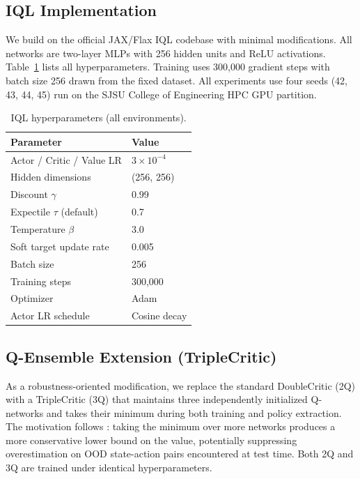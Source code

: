 \documentclass[conference]{IEEEtran}
\begin{document}
\subsection{IQL Implementation}

We build on the official JAX/Flax IQL codebase \cite{kostrikov2022code} with
minimal modifications. All networks are two-layer MLPs with 256 hidden units
and ReLU activations. Table~\ref{tab:hparams} lists all hyperparameters.
Training uses 300,000 gradient steps with batch size 256 drawn from the fixed
dataset. All experiments use four seeds (42, 43, 44, 45) run on the SJSU
College of Engineering HPC GPU partition.

\begin{table}[t]
  \centering
  \caption{IQL hyperparameters (all environments).}
  \label{tab:hparams}
  \begin{tabular}{ll}
    \toprule
    Parameter & Value \\
    \midrule
    Actor / Critic / Value LR & $3\times10^{-4}$ \\
    Hidden dimensions         & (256, 256) \\
    Discount $\gamma$         & 0.99 \\
    Expectile $\tau$ (default)& 0.7 \\
    Temperature $\beta$       & 3.0 \\
    Soft target update rate   & 0.005 \\
    Batch size                & 256 \\
    Training steps            & 300,000 \\
    Optimizer                 & Adam \\
    Actor LR schedule         & Cosine decay \\
    \bottomrule
  \end{tabular}
\end{table}

\subsection{Q-Ensemble Extension (TripleCritic)}

As a robustness-oriented modification, we replace the standard DoubleCritic
(2Q) with a TripleCritic (3Q) that maintains three independently initialized
Q-networks and takes their minimum during both training and policy extraction.
The motivation follows \cite{an2021edac}: taking the minimum over more networks
produces a more conservative lower bound on the value, potentially suppressing
overestimation on OOD state-action pairs encountered at test time. Both 2Q
and 3Q are trained under identical hyperparameters.
\end{document}
